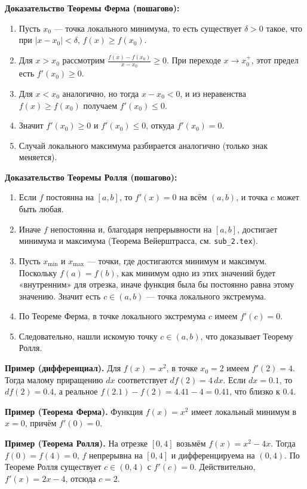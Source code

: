\medskip


\textbf{Доказательство Теоремы Ферма (пошагово):}
\begin{enumerate}
  \item Пусть $x_0$ — точка локального минимума, то есть существует $\delta>0$ такое, что при $|x-x_0|<\delta$, $f(x)\ge f(x_0)$.  
  \item Для $x>x_0$ рассмотрим $\frac{f(x)-f(x_0)}{x - x_0}\ge0$. При переходе $x\to x_0^+$, этот предел есть $f'(x_0)\ge0$.  
  \item Для $x<x_0$ аналогично, но тогда $x - x_0<0$, и из неравенства $f(x)\ge f(x_0)$ получаем $f'(x_0)\le0$.  
  \item Значит $f'(x_0)\ge0$ и $f'(x_0)\le0$, откуда $f'(x_0)=0$.  
  \item Случай локального максимума разбирается аналогично (только знак меняется).
\end{enumerate}

\textbf{Доказательство Теоремы Ролля (пошагово):}
\begin{enumerate}
  \item Если $f$ постоянна на $[a,b]$, то $f'(x)=0$ на всём $(a,b)$, и точка $c$ может быть любая.  
  \item Иначе $f$ непостоянна и, благодаря непрерывности на $[a,b]$, достигает минимума и максимума (Теорема Вейерштрасса, см. \texttt{sub\_2.tex}).  
  \item Пусть $x_{\min}$ и $x_{\max}$ — точки, где достигаются минимум и максимум. Поскольку $f(a)=f(b)$, как минимум одно из этих значений будет «внутренним» для отрезка, иначе функция была бы постоянно равна этому значению. Значит есть $c\in(a,b)$ — точка локального экстремума.  
  \item По Теореме Ферма, в точке локального экстремума $c$ имеем $f'(c)=0$.  
  \item Следовательно, нашли искомую точку $c\in(a,b)$, что доказывает Теорему Ролля.
\end{enumerate}

\medskip


\textbf{Пример (дифференциал).}
Для $f(x)=x^2$, в точке $x_0=2$ имеем $f'(2)=4$. Тогда малому приращению $dx$ соответствует $df(2)=4\,dx$. Если $dx=0.1$, то $df(2)=0.4$, а реальное $f(2.1)-f(2)=4.41-4=0.41$, что близко к $0.4$.

\textbf{Пример (Теорема Ферма).}
Функция $f(x)=x^2$ имеет локальный минимум в $x=0$, причём $f'(0)=0$.

\textbf{Пример (Теорема Ролля).}
На отрезке $[0,4]$ возьмём $f(x)=x^2 - 4x$. Тогда $f(0)=f(4)=0$, $f$ непрерывна на $[0,4]$ и дифференцируема на $(0,4)$. По Теореме Ролля существует $c\in(0,4)$ с $f'(c)=0$. Действительно, $f'(x)=2x-4$, отсюда $c=2$.

\medskip


